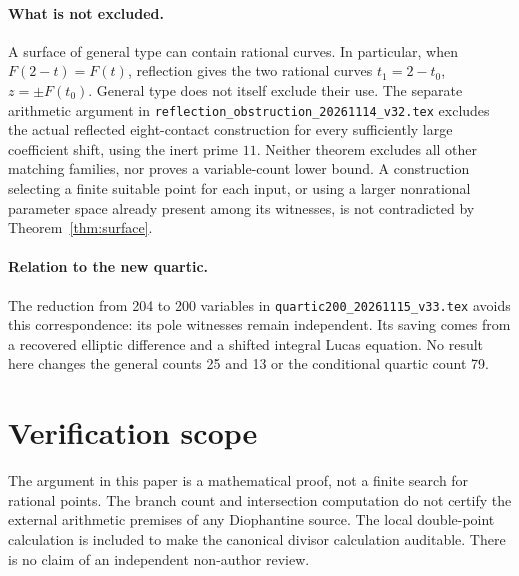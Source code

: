 \documentclass[11pt,a4paper]{article}
\begin{document}
\paragraph{What is not excluded.}
A surface of general type can contain rational curves. In particular,
when $F(2-t)=F(t)$, reflection gives the two rational curves
$t_1=2-t_0$, $z=\pm F(t_0)$. General type does not itself exclude their
use. The separate arithmetic argument in
\nolinkurl{reflection_obstruction_20261114_v32.tex} excludes the actual
reflected eight-contact construction for every sufficiently large
coefficient shift, using the inert prime $11$. Neither theorem excludes
all other matching families, nor proves a variable-count lower bound.
A construction selecting a finite suitable point for each input, or
using a larger nonrational parameter space already present among its
witnesses, is not contradicted by Theorem~\ref{thm:surface}.

\paragraph{Relation to the new quartic.}
The reduction from 204 to 200 variables in
\nolinkurl{quartic200_20261115_v33.tex} avoids this correspondence: its
pole witnesses remain independent. Its saving comes from a recovered
elliptic difference and a shifted integral Lucas equation. No result
here changes the general counts 25 and 13 or the conditional quartic
count 79.

\section*{Verification scope}
The argument in this paper is a mathematical proof, not a finite search
for rational points. The branch count and intersection computation do
not certify the external arithmetic premises of any Diophantine source.
The local double-point calculation is included to make the canonical
divisor calculation auditable. There is no claim of an independent
non-author review.
\end{document}
